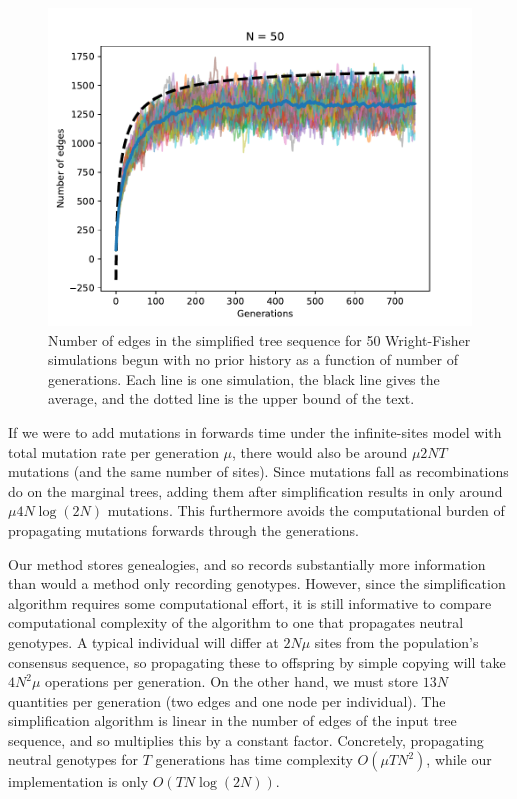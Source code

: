 \documentclass{article}
\begin{document}
\begin{figure}
    \begin{center}
        \includegraphics{sims/num_edges_50}
    \end{center}
    \caption{
        Number of edges in the simplified tree sequence
        for 50 Wright-Fisher simulations begun with no prior history
        as a function of number of generations.
        Each line is one simulation, the black line gives the average,
        and the dotted line is the upper bound of the text.
        \label{fig:num_edges}
    }
\end{figure}
 

If we were to add mutations in forwards time 
under the infinite-sites model with total mutation rate per generation $\mu$,
there would also be around $\mu 2NT$ mutations (and the same number of sites).
Since mutations fall as recombinations do on the marginal trees,
adding them after simplification results in only around $\mu 4 N \log(2N)$ mutations.
This furthermore avoids the computational burden of propagating mutations forwards through the generations.

Our method stores genealogies, and so records substantially more information 
than would a method only recording genotypes.
However, since the simplification algorithm requires some computational effort,
it is still informative to compare computational complexity of the algorithm
to one that propagates neutral genotypes.
A typical individual will differ at $2 N \mu$ sites from the population's consensus sequence,
so propagating these to offspring by simple copying will take $4 N^2 \mu$ operations per generation.
On the other hand, we must store $13N$ quantities per generation (two edges and one node per individual).
The simplification algorithm is linear in the number of edges of the input tree sequence,
and so multiplies this by a constant factor.
Concretely, propagating neutral genotypes for $T$ generations has time complexity $O(\mu T N^2)$,
while our implementation is only $O(T N \log(2N))$.
\end{document}
